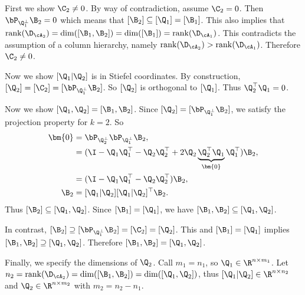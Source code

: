     First we show $\C_2 \neq 0$. By way of contradiction, assume $\C_2 = 0$. Then $\bP_{\Q_1^\perp}\B_2=0$ which means that $[\B_2] \subseteq [\Q_1] = [\B_1]$. This also implies that $\mathrm{rank}(\D_{\cA_2}) = \mathrm{dim}([\B_1,\B_2]) = \mathrm{dim}([\B_1]) = \mathrm{rank}(\D_{\cA_1})$. This contradicts the assumption of a column hierarchy, namely $\mathrm{rank}(\D_{\cA_2}) > \mathrm{rank}(\D_{\cA_1})$. Therefore $\C_2 \neq 0$.

    Now we show $[\Q_1|\Q_2]$ is in Stiefel coordinates. By construction, $[\Q_2] = [\C_2] = [\bP_{\Q_1^\perp}\B_2]$. So $[\Q_2]$ is orthogonal to $[\Q_1]$. Thus $\Q_2^\top \Q_1 = 0$.

    Now we show $[\Q_1,\Q_2] = [\B_1,\B_2]$. Since $[\Q_2] = [\bP_{\Q_1^\perp}\B_2]$, we satisfy the projection property for $k=2$. So
    \begin{align*}
        \bm{0} &= \bP_{\Q_2^{\perp}}\bP_{\Q_1^{\perp}}\B_2,\\
               &= (\I - \Q_1 \Q_1^\top - \Q_2 \Q_2^\top + 2 \Q_2 \underbrace{\Q_2^\top \Q_1}_{\bm{0}} \Q_1^\top)\B_2,\\
               &= (\I - \Q_1 \Q_1^\top - \Q_2 \Q_2^\top)\B_2,\\
        \B_2   &= [\Q_1|\Q_2][\Q_1|\Q_2]^\top \B_2.
    \end{align*}
    Thus $[\B_2] \subseteq [\Q_1,\Q_2]$. Since $[\B_1] = [\Q_1]$, we have $[\B_1,\B_2] \subseteq [\Q_1,\Q_2]$.
    
    In contrast, $[\B_2] \supseteq [\bP_{\Q_1^\perp}\B_2] = [\C_2] = [\Q_2]$. This and $[\B_1] = [\Q_1]$ implies $[\B_1,\B_2] \supseteq [\Q_1,\Q_2]$. Therefore $[\B_1,\B_2] = [\Q_1,\Q_2]$.
    
    Finally, we specify the dimensions of $\Q_2$. Call $m_1 = n_1$, so $\Q_1 \in \R^{n \times m_1}$. Let $n_2 = \mathrm{rank}(\D_{\cA_2}) = \mathrm{dim}([\B_1,\B_2]) = \mathrm{dim}([\Q_1,\Q_2])$, thus $[\Q_1|\Q_2] \in \R^{n \times n_2}$ and $\Q_2 \in \R^{n \times m_2}$ with $m_2 = n_2 - n_1$.




